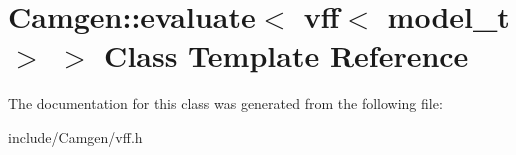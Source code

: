 \hypertarget{a00202}{\section{Camgen\-:\-:evaluate$<$ vff$<$ model\-\_\-t $>$ $>$ Class Template Reference}
\label{a00202}
}


The documentation for this class was generated from the following file\-:\begin{DoxyCompactItemize}
\item 
include/\-Camgen/vff.\-h\end{DoxyCompactItemize}
